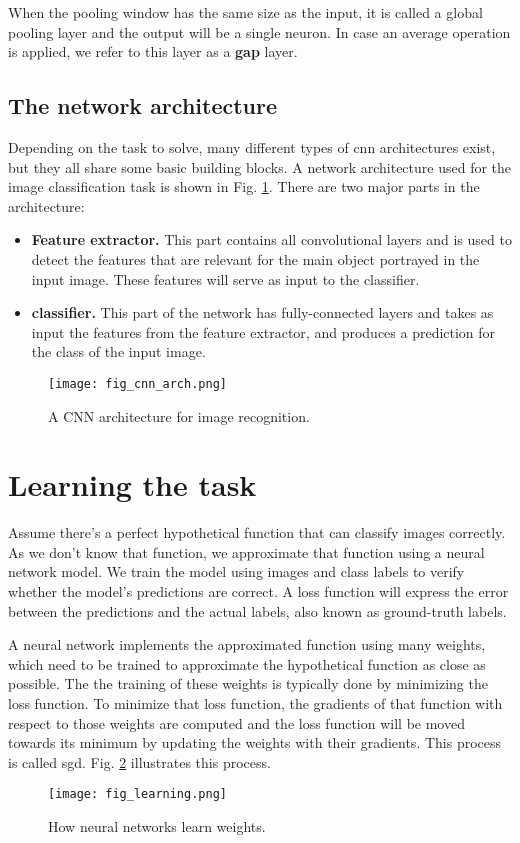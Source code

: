 When the pooling window has the same size as the input, it is called a global pooling layer and the output will be a single neuron. In case an average operation is applied, we refer to this layer as a \textbf{\acrfull{gap}} layer.


\subsection{The network architecture}
Depending on the task to solve, many different types of \acrshort{cnn} architectures exist, but they all share some basic building blocks. A network architecture used for the image classification task is shown in Fig. \ref{fig:cnn_arch}. There are two major parts in the architecture:
\begin{itemize}
\item \textbf{Feature extractor.} This part contains all convolutional layers and is used to detect the features that are relevant for the main object portrayed in the input image. These features will serve as input to the classifier.
\item \textbf{classifier.} This part of the network has fully-connected layers and takes as input the features from the feature extractor, and produces a   prediction for the class of the input image.
\end{itemize}
\begin{figure}[ht]
    \begin{center}       
    \texttt{[image: fig\_cnn\_arch.png]}
    \caption{A CNN architecture for image recognition.}
    \label{fig:cnn_arch}
    \end{center}
\end{figure}

\section{Learning the task}
Assume there's a perfect hypothetical function that can classify images correctly. As we don't know that function, we approximate that function using a neural network model. We train the model using images and class labels to verify whether the model's predictions are correct. A loss function will express the error between the predictions and the actual labels, also known as ground-truth labels.

A neural network implements the approximated function using many weights, which need to be trained to approximate the hypothetical function as close as possible. The the training of these weights is typically done by minimizing the loss function. To minimize that loss function, the gradients of that function with respect to those weights are computed and the loss function will be moved towards its minimum by updating the weights with their gradients. This process is called \acrfull{sgd}. Fig. \ref{fig:learning} illustrates this process.
\begin{figure}[ht]
    \begin{center}       
    \texttt{[image: fig\_learning.png]}
    \caption{How neural networks learn weights.}
    \label{fig:learning}
    \end{center}
\end{figure}

